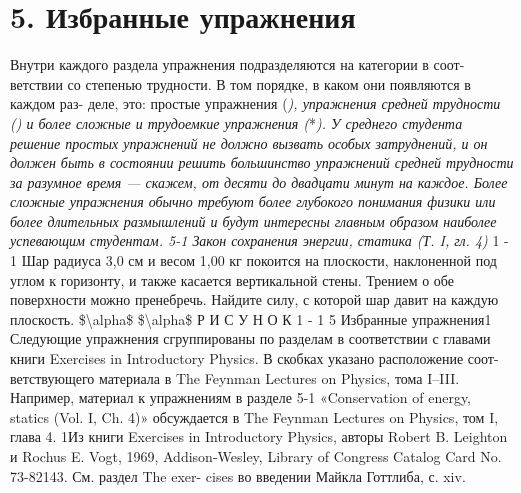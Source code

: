 \documentclass[10pt,oneside]{article}
\begin{document}
\section*{5. Избранные упражнения}
\label{tips-sec-13-5-избранные-упражнения}
Внутри каждого раздела упражнения подразделяются на категории в соот- ветствии со степенью трудности. В том порядке, в каком они появляются в каждом раз- деле, это: простые упражнения (\emph{), упражнения средней трудности (}\emph{) и более сложные и трудоемкие упражнения (}*\emph{). У среднего студента решение простых упражнений не должно вызвать особых затруднений, и он должен быть в состоянии решить большинство упражнений средней трудности за разумное время --- скажем, от десяти до двадцати минут на каждое. Более сложные упражнения обычно требуют более глубокого понимания физики или более длительных размышлений и будут интересны главным образом наиболее успевающим студентам. 5-1 Закон сохранения энергии, статика (Т. I, гл. 4) } 1 - 1 Шар радиуса 3,0 см и весом 1,00 кг покоится на плоскости, наклоненной под углом к горизонту, и также касается вертикальной стены. Трением о обе поверхности можно пренебречь. Найдите силу, с которой шар давит на каждую плоскость. \$\textbackslash{}alpha\$ \$\textbackslash{}alpha\$ Р И С У Н О К  1 - 1 5 Избранные упражнения1 Следующие упражнения сгруппированы по разделам в соответствии с главами книги Exercises in Introductory Physics. В скобках указано расположение соот- ветствующего материала в The Feynman Lectures on Physics, тома I–III. Например, материал к упражнениям в разделе 5-1 «Conservation of energy, statics (Vol. I, Ch. 4)» обсуждается в The Feynman Lectures on Physics, том I, глава 4. 1Из книги Exercises in Introductory Physics, авторы Robert B. Leighton и Rochus E. Vogt, 1969, Addison-Wesley, Library of Congress Catalog Card No. 73-82143. См. раздел The exer- cises во введении Майкла Готтлиба, с. xiv.\par
\end{document}
